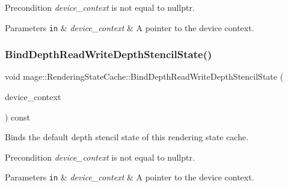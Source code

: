 \begin{DoxyPrecond}{Precondition}
{\itshape device\+\_\+context} is not equal to {\ttfamily nullptr}. 
\end{DoxyPrecond}

\begin{DoxyParams}[1]{Parameters}
\mbox{\tt in}  & {\em device\+\_\+context} & A pointer to the device context. \\
\hline
\end{DoxyParams}
\hypertarget{structmage_1_1_rendering_state_cache_a8f8f13644b1f636ba4150b60a6a3a3f3}{}\label{structmage_1_1_rendering_state_cache_a8f8f13644b1f636ba4150b60a6a3a3f3} 
\subsubsection{\texorpdfstring{Bind\+Depth\+Read\+Write\+Depth\+Stencil\+State()}{BindDepthReadWriteDepthStencilState()}}
{\footnotesize\ttfamily void mage\+::\+Rendering\+State\+Cache\+::\+Bind\+Depth\+Read\+Write\+Depth\+Stencil\+State (\begin{DoxyParamCaption}\item[{I\+D3\+D11\+Device\+Context2 $\ast$}]{device\+\_\+context }\end{DoxyParamCaption}) const\hspace{0.3cm}{\ttfamily [noexcept]}}

Binds the default depth stencil state of this rendering state cache.

\begin{DoxyPrecond}{Precondition}
{\itshape device\+\_\+context} is not equal to {\ttfamily nullptr}. 
\end{DoxyPrecond}

\begin{DoxyParams}[1]{Parameters}
\mbox{\tt in}  & {\em device\+\_\+context} & A pointer to the device context. \\
\hline
\end{DoxyParams}
\hypertarget{structmage_1_1_rendering_state_cache_a36258ec643ef6e4c194e336242fd2eae}{}\label{structmage_1_1_rendering_state_cache_a36258ec643ef6e4c194e336242fd2eae} 
